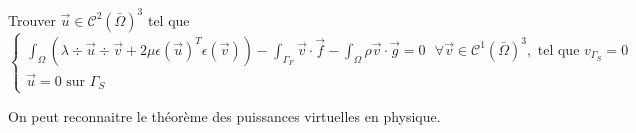 Trouver $\vec{u} \in \mathcal{C}^2(\bar{\Omega})^3$ tel que
\begin{equation}\label{varia}
    \begin{cases}
        \displaystyle\int_{\Omega} (\lambda \div \vec{u} \div \vec{v} + 2\mu \epsilon(\vec{u})^T \epsilon(\vec{v})) - \int_{\Gamma_F} \vec{v} \cdot \vec{f} - \int_\Omega \rho \vec{v} \cdot \vec{g} = 0 \textrm{ } \forall \vec{v} \in \mathcal{C}^1(\bar{\Omega})^3, \textrm{ tel que } v_{\Gamma_S} = 0\\
        \vec{u} = 0 \textrm{ sur } \Gamma_S
    \end{cases}
\end{equation}

On peut reconnaitre le théorème des puissances virtuelles en physique.

